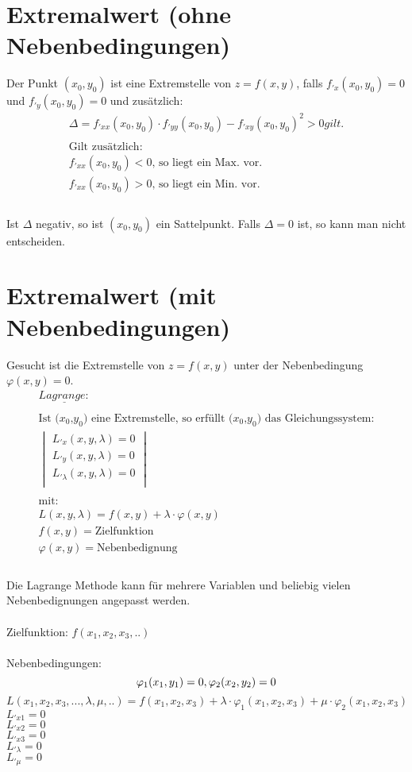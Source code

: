 	
\section{Extremalwert (ohne Nebenbedingungen)}
Der Punkt $(x_0,y_0)$ ist eine Extremstelle von $z=f(x,y)$, falls $f_{'x}(x_0,y_0)=0$ und $f_{'y}(x_0,y_0)=0$ und 
zusätzlich:
\[
\boxed{\begin{array}{l}
	\Delta=f_{'xx}(x_0,y_0)\cdot f_{'yy}(x_0,y_0)-f_{'xy}(x_0,y_0)^2  > 0 gilt.\\
	\\
	\text{Gilt zusätzlich:}\\
	f_{'xx}(x_0,y_0) < 0 \text{, so liegt ein Max. vor.}\\
	f_{'xx}(x_0,y_0) > 0 \text{, so liegt ein Min. vor.}\\
	\end{array}}\]
\\
Ist $\Delta$ negativ, so ist $(x_0,y_0)$ ein Sattelpunkt. Falls $\Delta =0$ ist, so kann man nicht entscheiden.


\section{Extremalwert (mit Nebenbedingungen)}
Gesucht ist die Extremstelle von $z=f(x,y)$ unter der Nebenbedingung $\varphi(x,y)=0$.\\
\[
\boxed{\begin{array}{l}
	\underline{Lagrange:}\\
	\\
	\text{Ist ($x_0$,$y_0$) eine Extremstelle, so erfüllt ($x_0$,$y_0$) das Gleichungssystem:}\\
		\begin{vmatrix}
			L_{'x}(x,y,\lambda)=0\\
			L_{'y}(x,y,\lambda)=0\\
			L_{'\lambda}(x,y,\lambda)=0\\
		\end{vmatrix}\\
		\\
		\text{mit:}\\
		L(x,y,\lambda)=f(x,y)+\lambda\cdot\varphi(x,y)\\
		f(x,y) = \text{Zielfunktion}\\
		\varphi(x,y) = \text{Nebenbedignung}\\
\end{array}}\]
\\
Die Lagrange Methode kann für mehrere Variablen und beliebig vielen Nebenbedignungen angepasst werden.\\
\\
Zielfunktion: $f(x_1,x_2,x_3,..)$\\
\\
Nebenbedingungen: 
\[
	\varphi_1(x_1,y_1)=0, \\  \varphi_2(x_2,y_2)=0
\]
\[
	L(x_1,x_2,x_3,...,\lambda,\mu,..)=f(x_1,x_2,x_3)+\lambda\cdot\varphi_1(x_1,x_2,x_3)+\mu\cdot\varphi_2(x_1,x_2,x_3)
\]
$L_{'x1}=0$\\	$L_{'x2}=0$\\
$L_{'x3}=0$ \\     $L_{'\lambda}=0$\\
$L_{'\mu}= 0$

